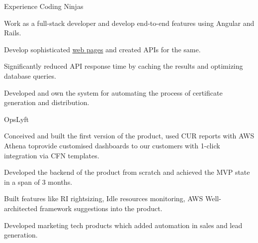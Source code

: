 \documentclass[]{resume-knyte}
\begin{document}
\begin{topic}{Experience}
    {Coding Ninjas}
    {\begin{tightitemize}
        \item Work as a full-stack developer and develop end-to-end features using Angular and Rails.
        \item Develop sophisticated \href{https://www.codingninjas.com/courses/premium-foundation-course}{web pages} and created APIs for the same.
        \item Significantly reduced API response time by caching the results and optimizing database queries.
        \item Developed and own the system for automating the process of certificate generation and distribution.
    \end{tightitemize}}
    {OpsLyft}
    {\begin{tightitemize}
        \item Conceived and built the first version of the product, used CUR reports with AWS Athena toprovide customised dashboards to our customers with 1-click integration via CFN templates.
        \item Developed the backend of the product from scratch and achieved the MVP state in a span of 3 months.
        \item Built features like RI rightsizing, Idle resources monitoring, AWS Well-architected framework suggestions into the product.
        \item Developed marketing tech products which added automation in sales and lead generation.
    \end{tightitemize}}
\end{topic}
\end{document}
